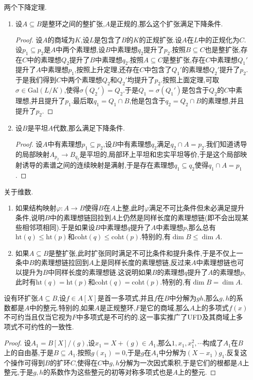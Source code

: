 两个下降定理.
\begin{enumerate}
	\item 设$A\subseteq B$是整环之间的整扩张,$A$是正规的,那么这个扩张满足下降条件.
	\begin{proof}
		
		设$A$的商域为$K$,设$L$是包含了$B$的$K$的正规扩张.设$A$在$L$中的正规化为$C$.设$p_1\subseteq p_2$是$A$中两个素理想,设$B$中素理想$q_2$提升了$p_2$.按照$B\subseteq C$也是整扩张,存在$C$中的素理想$Q_2$提升了$B$中素理想$q_2$.按照$A\subseteq C$是整扩张,存在$C$中素理想$Q_1'$提升了$A$中素理想$p_1$,按照上升定理,还存在$C$中包含了$Q_1'$的素理想$Q_2'$提升了$p_2$.于是我们得到$C$中两个素理想$Q_2$和$Q_2'$均提升了$p_2$.按照上面定理,可取$\sigma\in\mathrm{Gal}(L/K)$,使得$\sigma(Q_2')=Q_2$.于是$Q_1=\sigma(Q_1')$是包含于$Q_2$的$C$中素理想,并且提升了$p_1$.最后取$q_1=Q_1\cap B$,他是包含于$q_2=Q_2\cap B$的素理想,并且提升了$p_2$.
	\end{proof}
	\item 设$B$是平坦$A$代数,那么满足下降条件.
	\begin{proof}
		
		设$A$中有素理想$p_1\subseteq p_2$,设$B$中有素理想$q_2$满足$q_2\cap A=p_2$.我们知道诱导的局部映射$A_{p_2}\to B_{q_2}$是平坦的,局部环上平坦和忠实平坦等价,于是这个局部映射诱导的素谱之间的连续映射是满射,于是存在素理想$q_1\subseteq q_2$使得$q_1\cap A=p_1$.
	\end{proof}
\end{enumerate}

关于维数.
\begin{enumerate}
	\item 如果结构映射$\varphi:A\to B$使得$B$在$A$上整,此时$\varphi$满足不可比条件但未必满足提升条件,说明$B$中的素理想链回拉到$A$上仍然是同样长度的素理想链(即不会出现某些相邻项相同).于是如果设$B$中素理想$q$提升了$A$中素理想$p$,那么总有$\mathrm{ht}(q)\le\mathrm{ht}(p)$和$\mathrm{coht}(q)\le\mathrm{coht}(p)$.特别的,有$\dim B\le\dim A$.
	\item 如果$A\subseteq B$是整扩张,此时扩张同时满足不可比条件和提升条件,于是不仅上一条中$B$的素理想链拉回到$A$上是同样长度的素理想链,反过来$A$中素理想链也可以提升为$B$中同样长度的素理想链.这说明如果$B$的素理想$q$提升了$A$的素理想$p$,此时有$\mathrm{ht}(q)=\mathrm{ht}(p)$和$\mathrm{coht}(q)=\mathrm{coht}(p)$.特别的,有$\dim B=\dim A$.
\end{enumerate}

设有环扩张$A\subseteq B$,设$f\in A[X]$是首一多项式,并且$f$在$B$中分解为$gh$,那么$g,h$的系数都是$A$中的整元.特别的,如果$A$是正规整环,$F$是它的商域,那么$A$上的多项式$f(x)$不可约当且仅当它视为$F$中多项式是不可约的.这一事实推广了UFD及其商域上多项式不可约性的一致性.
\begin{proof}
	
	设$A_1=B[X]/(g)$,设$x_1=X+(g)\in A_1$,那么$1,x_1,x_1^2,\cdots$构成了$A_1$在$B$上的自由基,于是$B\subseteq A_1$.按照$g(x_1)=0$,于是$g$在$A_1$中分解为$(X-x_1)g_1$.反复这个操作可得到$B$的扩环$C$,使得在$C$中$g,h$分解为一次因式乘积,于是它们的根都是$A$上整元,于是$g,h$的系数作为这些整元的初等对称多项式也是$A$上的整元.
\end{proof}

